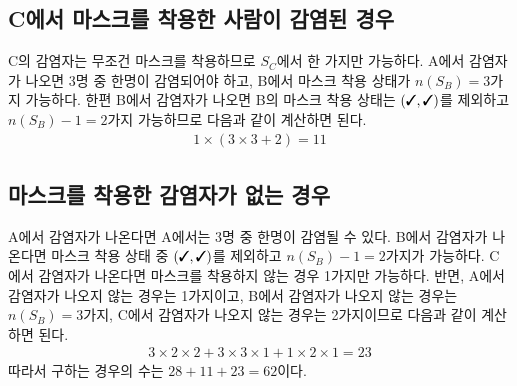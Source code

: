 \documentclass{scrartcl}
\newcommand{\cmark}{\ding{51}}
\begin{document}
\subsection{C에서 마스크를 착용한 사람이 감염된 경우}
C의 감염자는 무조건 마스크를 착용하므로 \(S_C\)에서 한 가지만 가능하다. A에서 감염자가 나오면 3명 중 한명이 감염되어야 하고, B에서 마스크 착용 상태가 \(n(S_B)=3\)가지 가능하다. 한편 B에서 감염자가 나오면 B의 마스크 착용 상태는 \((\text{\cmark}, \text{\cmark})\)를 제외하고 \(n(S_B)-1=2\)가지 가능하므로 다음과 같이 계산하면 된다.
\begin{align*}
  1\times(3\times 3+2)=11
\end{align*}

\subsection{마스크를 착용한 감염자가 없는 경우}
A에서 감염자가 나온다면 A에서는 3명 중 한명이 감염될 수 있다. B에서 감염자가 나온다면 마스크 착용 상태 중 \((\text{\cmark}, \text{\cmark})\)를 제외하고 \(n(S_B)-1=2\)가지가 가능하다. C에서 감염자가 나온다면 마스크를 착용하지 않는 경우 1가지만 가능하다. 반면, A에서 감염자가 나오지 않는 경우는 1가지이고, B에서 감염자가 나오지 않는 경우는 \(n(S_B)=3\)가지, C에서 감염자가 나오지 않는 경우는 2가지이므로 다음과 같이 계산하면 된다.
\begin{align*}
  3\times 2\times 2+3\times 3\times 1+1\times 2\times 1=23
\end{align*}
따라서 구하는 경우의 수는 \(28+11+23=62\)이다.
\end{document}
